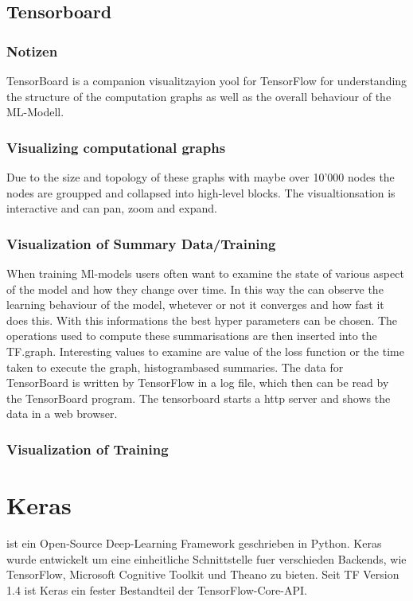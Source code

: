 \subsection{Tensorboard}
\subsubsection{Notizen}
TensorBoard is a companion visualitzayion yool for TensorFlow for understanding
the structure of the computation graphs as well as the overall behaviour of the
ML-Modell.

\subsubsection{Visualizing computational graphs}
Due to the size and topology of these graphs with maybe over 10'000 nodes the
nodes are groupped and collapsed into high-level blocks. The visualtionsation is
interactive and can pan, zoom and expand.

\subsubsection{Visualization of Summary Data/Training}
When training Ml-models users often want to examine the state of various aspect
of the model and how they change over time. In this way the can observe the
learning behaviour of the model, whetever or not it converges and how fast it
does this. With this informations the best hyper parameters can be chosen. The
operations used to compute these summarisations are then inserted into the
TF.graph. Interesting values to examine are value of the loss function or the
time taken to execute the graph, histogrambased summaries. The data for
TensorBoard is written by TensorFlow in a log file, which then can be read by
the TensorBoard program. The tensorboard starts a http server and shows the data
in a web browser.


\subsubsection{Visualization of Training}

\section{Keras}
 ist ein Open-Source Deep-Learning Framework geschrieben in
Python. Keras wurde entwickelt um eine einheitliche Schnittstelle fuer
verschieden Backends, wie TensorFlow, Microsoft Cognitive Toolkit und Theano zu
bieten. Seit TF Version 1.4 ist Keras ein fester Bestandteil der TensorFlow-Core-API.

